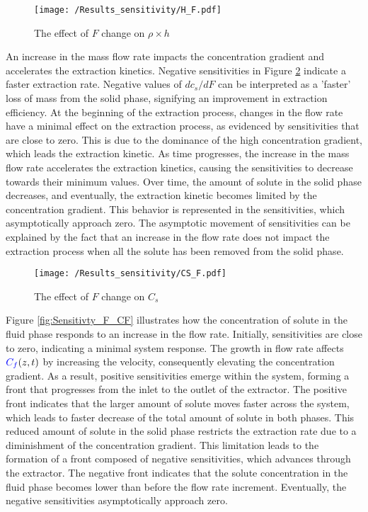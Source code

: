 \documentclass[../Article_Model_Parameters.tex]{subfiles}
\begin{document}
    \begin{figure}[h!]
    	\centering
    	\texttt{[image: /Results\_sensitivity/H\_F.pdf]}
    	\caption{The effect of $F$ change on $\rho \times h$}
    	\label{fig:Sensitivty_F_H}
    \end{figure}
   
   An increase in the mass flow rate impacts the concentration gradient and accelerates the extraction kinetics. Negative sensitivities in Figure \ref{fig:Sensitivty_F_CS} indicate a faster extraction rate. Negative values of $dc_s/dF$ can be interpreted as a 'faster' loss of mass from the solid phase, signifying an improvement in extraction efficiency. At the beginning of the extraction process, changes in the flow rate have a minimal effect on the extraction process, as evidenced by sensitivities that are close to zero. This is due to the dominance of the high concentration gradient, which leads the extraction kinetic. As time progresses, the increase in the mass flow rate accelerates the extraction kinetics, causing the sensitivities to decrease towards their minimum values. Over time, the amount of solute in the solid phase decreases, and eventually, the extraction kinetic becomes limited by the concentration gradient. This behavior is represented in the sensitivities, which asymptotically approach zero. The asymptotic movement of sensitivities can be explained by the fact that an increase in the flow rate does not impact the extraction process when all the solute has been removed from the solid phase.
    
    \begin{figure}[h!]
    	\centering
    	\texttt{[image: /Results\_sensitivity/CS\_F.pdf]}
    	\caption{The effect of $F$ change on $C_s$}
    	\label{fig:Sensitivty_F_CS}
    \end{figure}
    
    Figure \ref{fig:Sensitivty_F_CF} illustrates how the concentration of solute in the fluid phase responds to an increase in the flow rate. Initially, sensitivities are close to zero, indicating a minimal system response. The growth in flow rate affects ${\color{blue}C_f}(z,t)$ by increasing the velocity, consequently elevating the concentration gradient. As a result, positive sensitivities emerge within the system, forming a front that progresses from the inlet to the outlet of the extractor. The positive front indicates that the larger amount of solute moves faster across the system, which leads to faster decrease of the total amount of solute in both phases. This reduced amount of solute in the solid phase restricts the extraction rate due to a diminishment of the concentration gradient. This limitation leads to the formation of a front composed of negative sensitivities, which advances through the extractor. The negative front indicates that the solute concentration in the fluid phase becomes lower than before the flow rate increment. Eventually, the negative sensitivities asymptotically approach zero.
    
\end{document}
